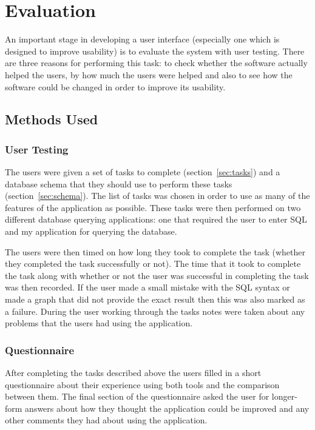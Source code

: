 \chapter{Evaluation}

An important stage in developing a user interface (especially one which is
designed to improve usability) is to evaluate the system with user testing.
There are three reasons for performing this task: to check whether the software
actually helped the users, by how much the users were helped and also to see
how the software could be changed in order to improve its usability.

\section{Methods Used}

\subsection{User Testing}

The users were given a set of tasks to complete (section~\ref{sec:tasks}) and
a database schema that they should use to perform these tasks
(section~\ref{sec:schema}). The list of tasks was chosen in order to use as
many of the features of the application as possible. These tasks were then
performed on two different database querying applications: one that required
the user to enter \ac{SQL} and my application for querying the database.

The users were then timed on how long they took to complete the task (whether
they completed the task successfully or not). The time that it took to complete
the task along with whether or not the user was successful in completing the
task was then recorded. If the user made a small mistake with the \ac{SQL}
syntax or made a graph that did not provide the exact result then this was also
marked as a failure. During the user working through the tasks notes were taken
about any problems that the users had using the application.

\subsection{Questionnaire}

After completing the tasks described above the users filled in a short
questionnaire about their experience using both tools and the comparison
between them. The final section of the questionnaire asked the user for
longer-form answers about how they thought the application could be improved
and any other comments they had about using the application.

